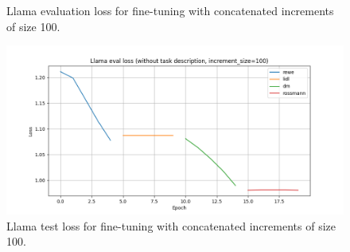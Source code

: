 \documentclass[licencjacka,en]{pracamgr}
\begin{document}
\begin{appendices}
\begin{figure}[h]
    \caption{Llama evaluation loss for fine-tuning with concatenated increments of size 100.}
    \label{fig:llama-inc-tot-100-eval}
\end{figure}
\begin{figure}[h]
    \centering
    \includegraphics[width=0.8\linewidth]{bachelor_images/llama_ft/llama-inc-100-tot-eval.png}
    \caption{Llama test loss for fine-tuning with concatenated increments of size 100.}
    \label{fig:llama-inc-tot-100-test}
\end{figure}



\end{appendices}
\end{document}
